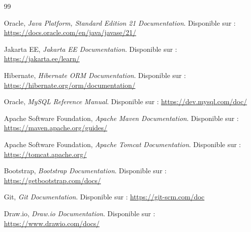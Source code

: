 
\begin{thebibliography}{99}
	
	Oracle,
	\textit{Java Platform, Standard Edition 21 Documentation}.
	Disponible sur : \url{https://docs.oracle.com/en/java/javase/21/}
	
	Jakarta EE,
	\textit{Jakarta EE Documentation}.
	Disponible sur : \url{https://jakarta.ee/learn/}
	
	Hibernate,
	\textit{Hibernate ORM Documentation}.
	Disponible sur : \url{https://hibernate.org/orm/documentation/}
	
	Oracle,
	\textit{MySQL Reference Manual}.
	Disponible sur : \url{https://dev.mysql.com/doc/}
	
	Apache Software Foundation,
	\textit{Apache Maven Documentation}.
	Disponible sur : \url{https://maven.apache.org/guides/}
	
	Apache Software Foundation,
	\textit{Apache Tomcat Documentation}.
	Disponible sur : \url{https://tomcat.apache.org/}
	
	Bootstrap,
	\textit{Bootstrap Documentation}.
	Disponible sur : \url{https://getbootstrap.com/docs/}
	
	Git,
	\textit{Git Documentation}.
	Disponible sur : \url{https://git-scm.com/doc}
	
	Draw.io,
	\textit{Draw.io Documentation}.
	Disponible sur : \url{https://www.drawio.com/docs/}
	
\end{thebibliography}